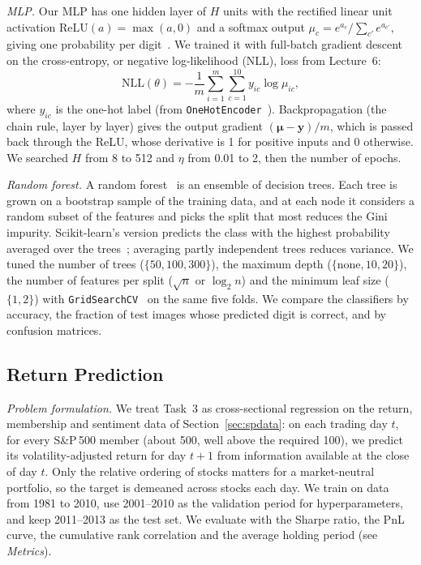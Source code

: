\documentclass[conference]{IEEEtran}
\newcommand{\vect}[1]{\mathbf{#1}}
\begin{document}
\textit{MLP.} Our MLP has one hidden layer of $H$ units with the rectified linear unit activation $\mathrm{ReLU}(a)=\max(a,0)$ and a softmax output $\mu_c=e^{a_c}/\sum_{c'}e^{a_{c'}}$, giving one probability per digit~\cite{notes}. We trained it with full-batch gradient descent on the cross-entropy, or negative log-likelihood (NLL), loss from Lecture~6:
\begin{equation}
\mathrm{NLL}(\theta)=-\frac{1}{m}\sum_{i=1}^{m}\sum_{c=1}^{10}y_{ic}\log\mu_{ic},
\label{eq:ce}
\end{equation}
where $y_{ic}$ is the one-hot label (from \texttt{OneHotEncoder}~\cite{skAPI}). Backpropagation (the chain rule, layer by layer) gives the output gradient $(\boldsymbol{\mu}-\vect{y})/m$, which is passed back through the ReLU, whose derivative is 1 for positive inputs and 0 otherwise. We searched $H$ from 8 to 512 and $\eta$ from 0.01 to 2, then the number of epochs.

\textit{Random forest.} A random forest~\cite{breiman} is an ensemble of decision trees. Each tree is grown on a bootstrap sample of the training data, and at each node it considers a random subset of the features and picks the split that most reduces the Gini impurity. Scikit-learn's version predicts the class with the highest probability averaged over the trees~\cite{skRF}; averaging partly independent trees reduces variance. We tuned the number of trees ($\{50,100,300\}$), the maximum depth ($\{\text{none},10,20\}$), the number of features per split ($\sqrt{n}$ or $\log_2 n$) and the minimum leaf size ($\{1,2\}$) with \texttt{GridSearchCV}~\cite{skAPI} on the same five folds. We compare the classifiers by accuracy, the fraction of test images whose predicted digit is correct, and by confusion matrices.

\subsection{Return Prediction}
\textit{Problem formulation.} We treat Task~3 as cross-sectional regression on the return, membership and sentiment data of Section~\ref{sec:spdata}: on each trading day $t$, for every S\&P\,500 member (about 500, well above the required 100), we predict its volatility-adjusted return for day $t+1$ from information available at the close of day $t$. Only the relative ordering of stocks matters for a market-neutral portfolio, so the target is demeaned across stocks each day. We train on data from 1981 to 2010, use 2001--2010 as the validation period for hyperparameters, and keep 2011--2013 as the test set. We evaluate with the Sharpe ratio, the PnL curve, the cumulative rank correlation and the average holding period (see \textit{Metrics}).
\end{document}
